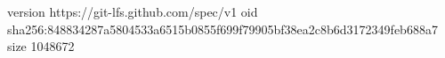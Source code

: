 version https://git-lfs.github.com/spec/v1
oid sha256:848834287a5804533a6515b0855f699f79905bf38ea2c8b6d3172349feb688a7
size 1048672
